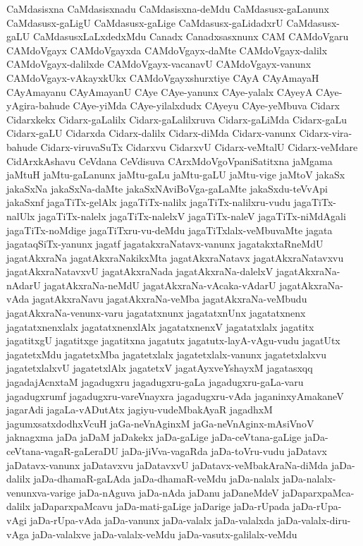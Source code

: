 {CaMdasisxna
CaMdasisxnadu
CaMdasisxna-deMdu
CaMdasusx-gaLanunx
CaMdasusx-gaLigU
CaMdasusx-gaLige
CaMdasusx-gaLidadxrU
CaMdasusx-gaLU
CaMdasusxLaLxdedxMdu
Canadx
Canadxsasxnunx
CAM
CAMdoVgaru
CAMdoVgayx
CAMdoVgayxda
CAMdoVgayx-daMte
CAMdoVgayx-dalilx
CAMdoVgayx-dalilxde
CAMdoVgayx-vacanavU
CAMdoVgayx-vanunx
CAMdoVgayx-vAkayxkUkx
CAMdoVgayxshurxtiye
CAyA
CAyAmayaH
CAyAmayanu
CAyAmayanU
CAye
CAye-yanunx
CAye-yalalx
CAyeyA
CAye-yAgira-bahude
CAye-yiMda
CAye-yilalxdudx
CAyeyu
CAye-yeMbuva
Cidarx
Cidarxkekx
Cidarx-gaLalilx
Cidarx-gaLalilxruva
Cidarx-gaLiMda
Cidarx-gaLu
Cidarx-gaLU
Cidarxda
Cidarx-dalilx
Cidarx-diMda
Cidarx-vanunx
Cidarx-vira-bahude
Cidarx-viruvaSuTx
Cidarxvu
CidarxvU
Cidarx-veMtalU
Cidarx-veMdare
CidArxkAshavu
CeVdana
CeVdisuva
CArxMdoVgoVpaniSatitxna
jaMgama
jaMtuH
jaMtu-gaLanunx
jaMtu-gaLu
jaMtu-gaLU
jaMtu-vige
jaMtoV
jakaSx
jakaSxNa
jakaSxNa-daMte
jakaSxNAviBoVga-gaLaMte
jakaSxdu-teVvApi
jakaSxnf
jagaTiTx-gelAlx
jagaTiTx-nalilx
jagaTiTx-nalilxru-vudu
jagaTiTx-nalUlx
jagaTiTx-nalelx
jagaTiTx-nalelxV
jagaTiTx-naleV
jagaTiTx-niMdAgali
jagaTiTx-noMdige
jagaTiTxru-vu-deMdu
jagaTiTxlalx-veMbuvaMte
jagata
jagataqSiTx-yanunx
jagatf
jagatakxraNatavx-vanunx
jagatakxtaRneMdU
jagatAkxraNa
jagatAkxraNakikxMta
jagatAkxraNatavx
jagatAkxraNatavxvu
jagatAkxraNatavxvU
jagatAkxraNada
jagatAkxraNa-dalelxV
jagatAkxraNa-nAdarU
jagatAkxraNa-neMdU
jagatAkxraNa-vAcaka-vAdarU
jagatAkxraNa-vAda
jagatAkxraNavu
jagatAkxraNa-veMba
jagatAkxraNa-veMbudu
jagatAkxraNa-venunx-varu
jagatatxnunx
jagatatxnUnx
jagatatxnenx
jagatatxnenxlalx
jagatatxnenxlAlx
jagatatxnenxV
jagatatxlalx
jagatitx
jagatitxgU
jagatitxge
jagatitxna
jagatutx
jagatutx-layA-vAgu-vudu
jagatUtx
jagatetxMdu
jagatetxMba
jagatetxlalx
jagatetxlalx-vanunx
jagatetxlalxvu
jagatetxlalxvU
jagatetxlAlx
jagatetxV
jagatAyxveYshayxM
jagatasxqq
jagadajAcnxtaM
jagadugxru
jagadugxru-gaLa
jagadugxru-gaLa-varu
jagadugxrumf
jagadugxru-vareVnayxra
jagadugxru-vAda
jaganinxyAmakaneV
jagarAdi
jagaLa-vADutAtx
jagiyu-vudeMbakAyaR
jagadhxM
jagumxsatxdodhxVcuH
jaGa-neVnAginxM
jaGa-neVnAginx-mAsiVnoV
jaknagxma
jaDa
jaDaM
jaDakekx
jaDa-gaLige
jaDa-ceVtana-gaLige
jaDa-ceVtana-vagaR-gaLeraDU
jaDa-jiVva-vagaRda
jaDa-toVru-vudu
jaDatavx
jaDatavx-vanunx
jaDatavxvu
jaDatavxvU
jaDatavx-veMbakAraNa-diMda
jaDa-dalilx
jaDa-dhamaR-gaLAda
jaDa-dhamaR-veMdu
jaDa-nalalx
jaDa-nalalx-venunxva-varige
jaDa-nAguva
jaDa-nAda
jaDanu
jaDaneMdeV
jaDaparxpaMca-dalilx
jaDaparxpaMcavu
jaDa-mati-gaLige
jaDarige
jaDa-rUpada
jaDa-rUpa-vAgi
jaDa-rUpa-vAda
jaDa-vanunx
jaDa-valalx
jaDa-valalxda
jaDa-valalx-diru-vAga
jaDa-valalxve
jaDa-valalx-veMdu
jaDa-vasutx-galilalx-veMdu
}
